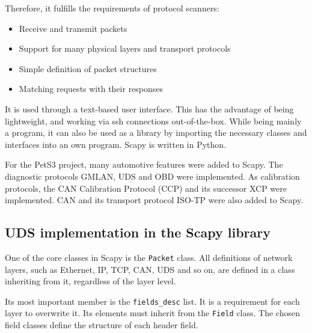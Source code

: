Therefore, it fulfills the requirements of protocol scanners:
\begin{itemize}
    \item Receive and transmit packets
    \item Support for many physical layers and transport protocols
    \item Simple definition of packet structures
    \item Matching requests with their responses
\end{itemize}

It is used through a text-based user interface. This has the advantage of being lightweight, and working via ssh connections out-of-the-box. While being mainly a program, it can also be used as a library by importing the necessary classes and interfaces into an own program. Scapy is written in Python.

For the PetS3 project, many automotive features were added to Scapy. The diagnostic protocols GMLAN, UDS and OBD were implemented. As calibration protocols, the CAN Calibration Protocol (CCP) and its successor XCP were implemented. CAN and its transport protocol ISO-TP were also added to Scapy.

\subsection{UDS implementation in the Scapy library}

One of the core classes in Scapy is the \texttt{Packet} class. All definitions of network layers, such as Ethernet, IP, TCP, CAN, UDS and so on, are defined in a class inheriting from it, regardless of the layer level.

Its most important member is the \texttt{fields_desc} list. It is a requirement for each layer to overwrite it. Its elements must inherit from the \texttt{Field} class. The chosen field classes define the structure of each header field.


